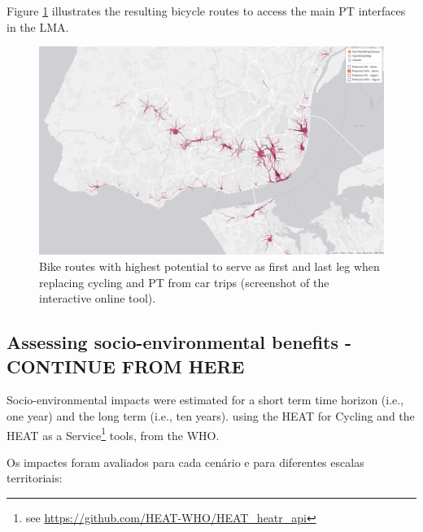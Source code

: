 \documentclass[runningheads]{llncs}
\begin{document}
Figure \ref{fig:map2} illustrates the resulting bicycle routes to access
the main PT interfaces in the LMA.

\begin{figure}

{\centering \includegraphics[width=0.8\linewidth,]{img/map2} 

}

\caption{Bike routes with highest potential to serve as first and last leg when replacing cycling and PT from car trips (screenshot of the interactive online tool).}\label{fig:map2}
\end{figure}

\hypertarget{assessing-socio-environmental-benefits---continue-from-here}{%
\subsection{Assessing socio-environmental benefits - CONTINUE FROM
HERE}\label{assessing-socio-environmental-benefits---continue-from-here}}

Socio-environmental impacts were estimated for a short term time horizon
(i.e., one year) and the long term (i.e., ten years). using the HEAT for
Cycling and the HEAT as a Service\footnote{see
  \url{https://github.com/HEAT-WHO/HEAT_heatr_api}} tools, from the WHO.

Os impactes foram avaliados para cada cenário e para diferentes escalas
territoriais:
\end{document}
